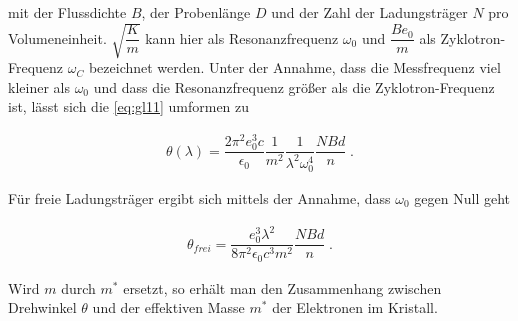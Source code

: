     mit der Flussdichte $B$, der Probenlänge $D$ und der Zahl der Ladungsträger $N$ pro Volumeneinheit. $\sqrt{\dfrac{K}{m}}$
    kann hier als Resonanzfrequenz $\omega_0$ und $\dfrac{Be_0}{m}$ als Zyklotron-Frequenz $\omega_C$ bezeichnet werden. 
    Unter der Annahme, dass die Messfrequenz viel kleiner als $\omega_0$ und dass die Resonanzfrequenz größer als die Zyklotron-Frequenz ist,
    lässt sich die \autoref{eq:gl11} umformen zu

    \begin{align*}
    \theta(\lambda)=\dfrac{2\pi^2 e_0^3 c}{\epsilon_0}\dfrac{1}{m^2}\dfrac{1}{\lambda^2 \omega_0^4}\dfrac{NBd}{n}\; .
    \end{align*}

    Für freie Ladungsträger ergibt sich mittels der Annahme, dass $\omega_0$ gegen Null geht

    \begin{align}
    \label{eq:gl12}
    \theta_{frei}=\dfrac{e_0^3\lambda^2}{8 \pi^2 \epsilon_0 c^3 m^2 }\dfrac{NBd}{n}\; .
    \end{align}

    Wird $m$ durch $m^*$ ersetzt, so erhält man den Zusammenhang zwischen Drehwinkel $\theta$ und der effektiven Masse $m^*$
    der Elektronen im Kristall.

    \newpage